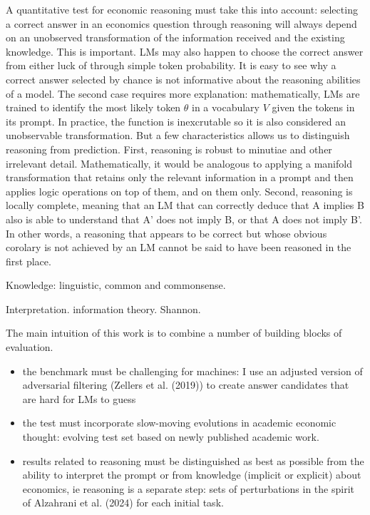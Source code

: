 \documentclass[
]{article}
\begin{document}
A quantitative test for economic reasoning must take this into account:
selecting a correct answer in an economics question through reasoning
will always depend on an unobserved transformation of the information
received and the existing knowledge. This is important. LMs may also
happen to choose the correct answer from either luck of through simple
token probability. It is easy to see why a correct answer selected by
chance is not informative about the reasoning abilities of a model. The
second case requires more explanation: mathematically, LMs are trained
to identify the most likely token \(\theta\) in a vocabulary \(V\) given
the tokens in its prompt. In practice, the function is inexcrutable so
it is also considered an unobservable transformation. But a few
characteristics allows us to distinguish reasoning from prediction.
First, reasoning is robust to minutiae and other irrelevant detail.
Mathematically, it would be analogous to applying a manifold
transformation that retains only the relevant information in a prompt
and then applies logic operations on top of them, and on them only.
Second, reasoning is locally complete, meaning that an LM that can
correctly deduce that A implies B also is able to understand that A'
does not imply B, or that A does not imply B'. In other words, a
reasoning that appears to be correct but whose obvious corolary is not
achieved by an LM cannot be said to have been reasoned in the first
place.

Knowledge: linguistic, common and commonsense.

Interpretation. information theory. Shannon.

The main intuition of this work is to combine a number of building
blocks of evaluation.

\begin{itemize}
\item
  the benchmark must be challenging for machines: I use an adjusted
  version of adversarial filtering (Zellers et al. (2019)) to create
  answer candidates that are hard for LMs to guess
\item
  the test must incorporate slow-moving evolutions in academic economic
  thought: evolving test set based on newly published academic work.
\item
  results related to reasoning must be distinguished as best as possible
  from the ability to interpret the prompt or from knowledge (implicit
  or explicit) about economics, ie reasoning is a separate step: sets of
  perturbations in the spirit of Alzahrani et al. (2024) for each
  initial task.
\end{itemize}
\end{document}
